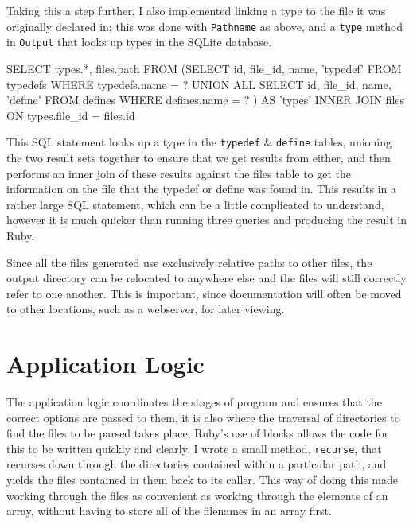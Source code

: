     Taking this a step further, I also implemented linking a type to the file it
    was originally declared in; this was done with \lstinline|Pathname| as
    above, and a \lstinline|type| method in \lstinline|Output| that looks up
    types in the SQLite database.

    \begin{code}[language=sql, gobble=6]
      SELECT types.*, files.path FROM
       (SELECT id, file_id, name, 'typedef' FROM typedefs WHERE typedefs.name = ?
        UNION ALL
        SELECT id, file_id, name, 'define' FROM defines WHERE defines.name = ?
       ) AS 'types' INNER JOIN files ON types.file_id = files.id
    \end{code}

    This SQL statement looks up a type in the \lstinline|typedef| \&
    \lstinline|define| tables, unioning the two result sets together to ensure
    that we get results from either, and then performs an inner join of these
    results against the files table to get the information on the file that the
    typedef or define was found in. This results in a rather large SQL
    statement, which can be a little complicated to understand, however it is
    much quicker than running three queries and producing the result in Ruby.

    Since all the files generated use exclusively relative paths to other files,
    the output directory can be relocated to anywhere else and the files will
    still correctly refer to one another. This is important, since documentation
    will often be moved to other locations, such as a webserver, for later
    viewing.

\section{Application Logic}

The application logic coordinates the stages of program and ensures that the
correct options are passed to them, it is also where the traversal of
directories to find the files to be parsed takes place; Ruby's use of blocks
allows the code for this to be written quickly and clearly. I wrote a small
method, \lstinline|recurse|, that recurses down through the directories
contained within a particular path, and yields the files contained in them back
to its caller. This way of doing this made working through the files as
convenient as working through the elements of an array, without having to store
all of the filenames in an array first.

